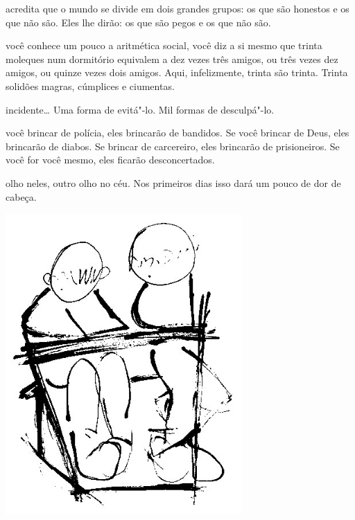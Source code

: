 \pagebreak


 acredita que o mundo se divide em dois grandes grupos: os que são
honestos e os que não são. Eles lhe dirão: os que são pegos e os que não
são.



 você conhece um pouco a aritmética social, você diz a si mesmo que
trinta moleques num dormitório equivalem a dez vezes três amigos, ou
três vezes dez amigos, ou quinze vezes dois amigos. Aqui, infelizmente,
trinta são trinta. Trinta solidões magras, cúmplices e ciumentas.




 incidente\ldots{} Uma forma de evitá"-lo. Mil formas de desculpá"-lo.



 você brincar de polícia, eles brincarão de bandidos. Se você brincar
de Deus, eles brincarão de diabos. Se brincar de carcereiro, eles
brincarão de prisioneiros. Se você for você mesmo, eles ficarão
desconcertados.



 olho neles, outro olho no céu. Nos primeiros dias isso dará um pouco
de dor de cabeça.


\pagebreak
\thispagestyle{empty}

\begin{vplace}[.50]
\begin{center}
\includegraphics[width=90mm]{./imgs/Image_5.jpg}
\end{center}
\end{vplace}

